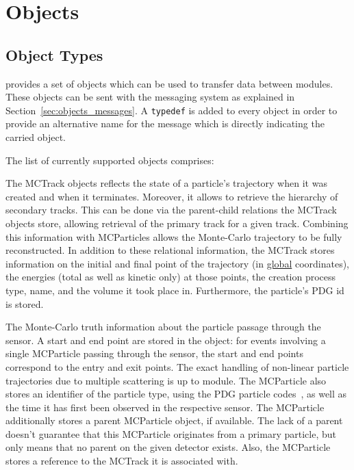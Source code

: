 \chapter{Objects}
\label{ch:objects}

\section{Object Types}
\label{sec:objtypes}

\apsq provides a set of objects which can be used to transfer data between modules.
These objects can be sent with the messaging system as explained in Section~\ref{sec:objects_messages}.
A \texttt{typedef} is added to every object in order to provide an alternative name for the message which is directly indicating the carried object.

The list of currently supported objects comprises:


The MCTrack objects reflects the state of a particle's trajectory when it was created and when it terminates.
Moreover, it allows to retrieve the hierarchy of secondary tracks.
This can be done via the parent-child relations the MCTrack objects store, allowing retrieval of the primary track for a given track.
Combining this information with MCParticles allows the Monte-Carlo trajectory to be fully reconstructed.
In addition to these relational information, the MCTrack stores information on the initial and final point of the trajectory (in \underline{global} coordinates), the energies (total as well as kinetic only) at those points, the creation process type, name, and the volume it took place in.
Furthermore, the particle's PDG id is stored.

The Monte-Carlo truth information about the particle passage through the sensor.
A start and end point are stored in the object: for events involving a single MCParticle passing through the sensor, the start and end points correspond to the entry and exit points.
The exact handling of non-linear particle trajectories due to multiple scattering is up to module.
The MCParticle also stores an identifier of the particle type, using the PDG particle codes~\cite{pdg}, as well as the time it has first been observed in the respective sensor.
The MCParticle additionally stores a parent MCParticle object, if available.
The lack of a parent doesn't guarantee that this MCParticle originates from a primary particle, but only means that no parent on the given detector exists.
Also, the MCParticle stores a reference to the MCTrack it is associated with.

